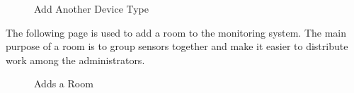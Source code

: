 \documentclass{report}
\begin{document}
\begin{figure}[H]
\caption{Add Another Device Type}
\end{figure}

The following page is used to add a room to the monitoring system.
The main purpose of a room is to group sensors together and make it easier to distribute work among the administrators.

\begin{figure}[H]
\caption{Adds a Room}
\end{figure}
\end{document}
